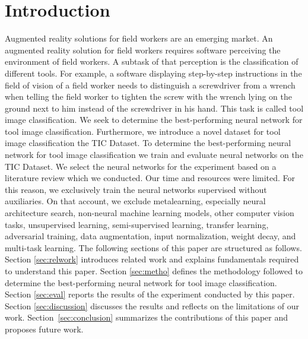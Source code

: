 \documentclass[a4paper, 10pt, journal]{wissarbIEEE}
\begin{document}
\section{Introduction}
\label{sec:intro}
Augmented reality solutions for field workers are an emerging market.\cite{EY.2019a, EY.2019b, Detzel.2018, Shook.2019, Guy.2019} An augmented reality solution for field workers requires software perceiving the environment of field workers. A subtask of that perception is the classification of different tools. For example, a software displaying step-by-step instructions in the field of vision of a field worker needs to distinguish a screwdriver from a wrench when telling the field worker to tighten the screw with the wrench lying on the ground next to him instead of the screwdriver in his hand. This task is called tool image classification. We seek to determine the best-performing neural network for tool image classification. Furthermore, we introduce a novel dataset for tool image classification the TIC Dataset. To determine the best-performing neural network for tool image classification we train and evaluate neural networks on the TIC Dataset. We select the neural networks for the experiment based on a literature review which we conducted. Our time and resources were limited. For this reason, we exclusively train the neural networks supervised without auxiliaries. On that account, we exclude metalearning, especially neural architecture search, non-neural machine learning models, other computer vision tasks, unsupervised learning, semi-supervised learning, transfer learning, adversarial training, data augmentation, input normalization, weight decay, and multi-task learning. The following sections of this paper are structured as follows. Section \ref{sec:relwork} introduces related work and explains fundamentals required to understand this paper. Section \ref{sec:metho} defines the methodology followed to determine the best-performing neural network for tool image classification. Section \ref{sec:eval} reports the results of the experiment conducted by this paper. Section \ref{sec:discussion} discusses the results and reflects on the limitations of our work. Section~\ref{sec:conclusion} summarizes the contributions of this paper and proposes future work.
\end{document}
